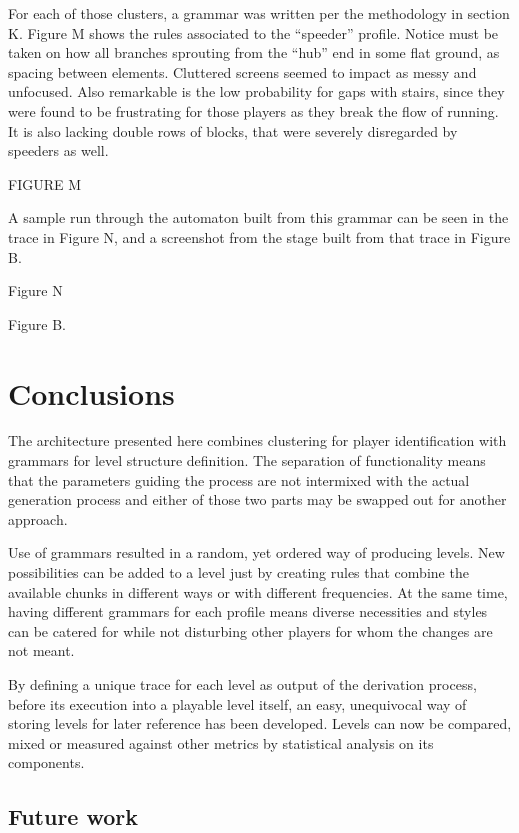 \documentclass[conference]{IEEEtran}
\begin{document}
For each of those clusters, a grammar was written per the methodology in section K. Figure M shows the rules associated to the ``speeder'' profile. Notice must be taken on how all branches sprouting from the ``hub'' end in some flat ground, as spacing between elements. Cluttered screens seemed to impact as messy and unfocused. Also remarkable is the low probability for gaps with stairs, since they were found to be frustrating for those players as they break the flow of running. It is also lacking double rows of blocks, that were severely disregarded by speeders as well.

FIGURE M

A sample run through the automaton built from this grammar can be seen in the trace in Figure N, and a screenshot from the stage built from that trace in Figure B.

Figure N

Figure B.



\section{Conclusions}

The architecture presented here combines clustering for player identification with grammars for level structure definition. The separation of functionality means that the parameters guiding the process are not intermixed with the actual generation process and either of those two parts may be swapped out for another approach.

Use of grammars resulted in a random, yet ordered way of producing levels. New possibilities can be added to a level just by creating rules that combine the available chunks in different ways or with different frequencies. At the same time, having different grammars for each profile means diverse necessities and styles can be catered for while not disturbing other players for whom the changes are not meant.

By defining a unique trace for each level as output of the derivation process, before its execution into a playable level itself, an easy, unequivocal way of storing levels for later reference has been developed. Levels can now be compared, mixed or measured against other metrics by statistical analysis on its components.  

\subsection*{Future work}
\end{document}
